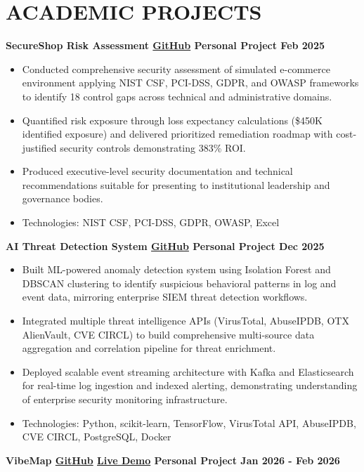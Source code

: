\documentclass[11pt]{article}
\begin{document}
\section*{ACADEMIC PROJECTS}
\textbf{SecureShop Risk Assessment \href{https://github.com/jeff13in/SecureShop-Risk-Assessment}{GitHub} \textbar{} Personal Project \textbar{} Feb 2025}
\begin{itemize}[leftmargin=1.5em, topsep=0pt, itemsep=0pt, parsep=0pt]
\item    Conducted comprehensive security assessment of simulated e-commerce environment applying NIST CSF, PCI-DSS, GDPR, and OWASP frameworks to identify 18 control gaps across technical and administrative domains.
\item    Quantified risk exposure through loss expectancy calculations (\$450K identified exposure) and delivered prioritized remediation roadmap with cost-justified security controls demonstrating 383\% ROI.
\item    Produced executive-level security documentation and technical recommendations suitable for presenting to institutional leadership and governance bodies.
\item    Technologies: NIST CSF, PCI-DSS, GDPR, OWASP, Excel
\end{itemize}
\textbf{AI Threat Detection System \href{https://github.com/jeff13in/AI-threat_Detection}{GitHub} \textbar{} Personal Project \textbar{} Dec 2025}
\begin{itemize}[leftmargin=1.5em, topsep=0pt, itemsep=0pt, parsep=0pt]
\item    Built ML-powered anomaly detection system using Isolation Forest and DBSCAN clustering to identify suspicious behavioral patterns in log and event data, mirroring enterprise SIEM threat detection workflows.
\item    Integrated multiple threat intelligence APIs (VirusTotal, AbuseIPDB, OTX AlienVault, CVE CIRCL) to build comprehensive multi-source data aggregation and correlation pipeline for threat enrichment.
\item    Deployed scalable event streaming architecture with Kafka and Elasticsearch for real-time log ingestion and indexed alerting, demonstrating understanding of enterprise security monitoring infrastructure.
\item    Technologies: Python, scikit-learn, TensorFlow, VirusTotal API, AbuseIPDB, CVE CIRCL, PostgreSQL, Docker
\end{itemize}
\textbf{VibeMap \href{https://github.com/jeff13in/VibeMap}{GitHub} \textbar{} \href{https://vibe-map-azure.vercel.app/}{Live Demo} \textbar{} Personal Project \textbar{} Jan 2026 - Feb 2026}
\end{document}
